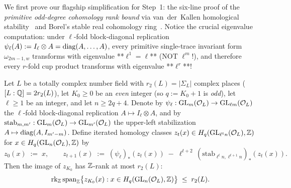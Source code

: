 We first prove our flagship simplification for Step~1: the six-line proof of the \emph{primitive odd-degree cohomology rank bound} via van~der~Kallen homological stability~\cite{vanderKallen1980} and Borel's stable real cohomology ring~\cite{Borel1974}. Notice the crucial eigenvalue computation: under $\ell$-fold block-diagonal replication $\psi_\ell(A) := I_\ell \otimes A = \operatorname{diag}(A, \dots, A)$, every primitive single-trace invariant form $\omega_{2m-1, w}$ transforms with eigenvalue **$\ell^1 = \ell$** (NOT $\ell^m$!), and therefore every $r$-fold cup product transforms with eigenvalue **$\ell^r$**!


\begin{proposition}
\label{prop:19:bodd}
Let $L$ be a totally complex number field with $r_2(L) = |\Sigma_L|$ complex places ($[L:\mathbb{Q}] = 2 r_2(L)$), let $K_0 \ge 0$ be an \emph{even} integer (so $q := K_0 + 1$ is \emph{odd}), let $\ell \ge 1$ be an integer, and let $n \ge 2q + 4$. Denote by $\psi_\ell : \mathrm{GL}_m(\mathcal{O}_L) \to \mathrm{GL}_{\ell m}(\mathcal{O}_L)$ the $\ell$-fold block-diagonal replication $A \mapsto I_\ell \otimes A$, and by $\mathrm{stab}_{m, m'} : \mathrm{GL}_m(\mathcal{O}_L) \to \mathrm{GL}_{m'}(\mathcal{O}_L)$ the upper-left stabilization $A \mapsto \operatorname{diag}(A, I_{m'-m})$. Define iterated homology classes $z_t(x) \in H_q(\mathrm{GL}_{\ell^t n}(\mathcal{O}_L), \mathbb{Z})$ for $x \in H_q(\mathrm{GL}_n(\mathcal{O}_L), \mathbb{Z})$ by
\[
  z_0(x) \;:=\; x, \qquad
  z_{t+1}(x) \;:=\; (\psi_\ell)_*(z_t(x)) \;-\; \ell^{t+2}\,(\mathrm{stab}_{\ell^t n, \ell^{t+1} n})_*(z_t(x)).
\]
Then the image of $z_{K_0}$ has $\mathbb{Z}$-rank at most $r_2(L)$:
\begin{equation}
\label{eq:19:bodd}
  \operatorname{rk}_{\mathbb{Z}}\operatorname{span}_{\mathbb{Z}}\bigl\{z_{K_0}(x) : x \in H_q(\mathrm{GL}_n(\mathcal{O}_L), \mathbb{Z})\bigr\} \;\le\; r_2(L).
\end{equation}
\end{proposition}


